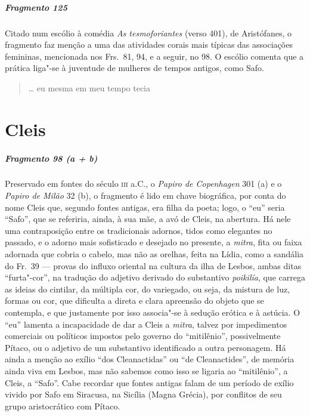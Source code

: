 \paragraph{Fragmento 125}

{\small Citado num escólio à comédia \textit{As tesmoforiantes} (verso 401), de Aristófanes, o fragmento faz menção a uma das atividades corais mais típicas das associações femininas, mencionada nos Frs.~81, 94, e a seguir, no 98. O escólio comenta que a prática liga"-se à juventude de mulheres de tempos antigos, como Safo.}

\begin{verse}
\ldots{} eu mesma em meu tempo tecia 
\end{verse}


\chapter{Cleis}


\paragraph{Fragmento 98 (a + b)}

{\small Preservado em fontes do século \textsc{iii} a.C., o \textit{Papiro de Copenhagen} 301 (a) e o \textit{Papiro de Milão} 32 (b),
o fragmento é lido em chave biográfica, por conta do
nome Cleis que, segundo fontes antigas, era filha da poeta; logo, o “eu” seria
``Safo”, que se referiria, ainda, à sua mãe, a avó de Cleis, na
abertura. Há nele uma contraposição entre os tradicionais adornos, tidos como		\EP[]
elegantes no passado, e o adorno mais sofisticado e desejado no presente, a
\textit{mitra}, fita ou faixa adornada que cobria o cabelo, mas não as orelhas,
feita na Lídia, como a sandália do Fr.~39 --- provas do influxo oriental na
cultura da ilha de Lesbos, ambas ditas ``furta"-cor”, na tradução do
adjetivo derivado do substantivo \textit{poikilía}, que carrega as ideias do
cintilar, da múltipla cor, do variegado, ou seja, da mistura de luz, formas ou
cor, que dificulta a direta e clara apreensão do objeto que se contempla, e que
justamente por isso associa"-se à sedução erótica e à astúcia. O “eu” lamenta a
incapacidade de dar a Cleis a \textit{mitra}, talvez por impedimentos
comerciais ou políticos impostos pelo governo do “mitilênio”, possivelmente
Pítaco, ou o adjetivo de um substantivo identificado a outra personagem. Há
ainda a menção ao exílio “dos Cleanactidas” ou “de Cleanactides”, de memória
ainda viva em Lesbos, mas não sabemos como isso se ligaria ao
“mitilênio”, a Cleis, a ``Safo”. Cabe recordar que fontes antigas falam
de um período de exílio vivido por Safo em Siracusa, na Sicília (Magna Grécia),
por conflitos de seu grupo aristocrático com Pítaco.}

